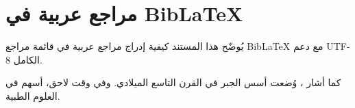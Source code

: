\documentclass[12pt, a4paper]{article}
\begin{document}
\section{مراجع عربية في BibLaTeX}

يُوضّح هذا المستند كيفية إدراج مراجع عربية في قائمة مراجع
BibLaTeX مع دعم UTF-8 الكامل.

كما أشار \textcite{alKhwarizmi1983}، وُضعت أسس الجبر في القرن
التاسع الميلادي. وفي وقت لاحق، أسهم \textcite{ibnSina2005} في
العلوم الطبية.

\printbibliography
\end{document}
